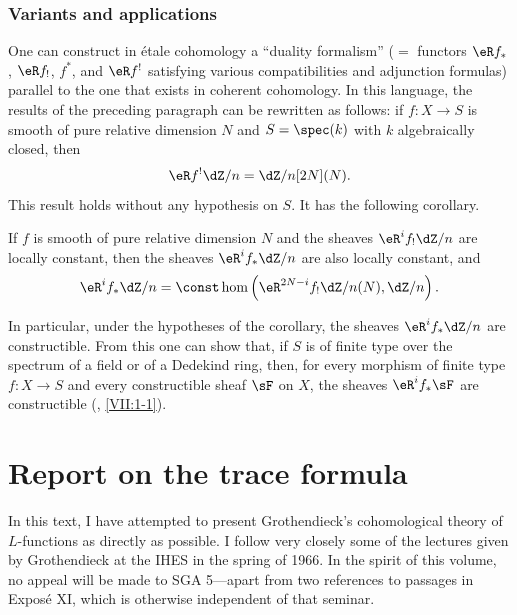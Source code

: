 \documentclass[oneside]{book}
\begin{document}
\subsection{Variants and applications}\label{I:6-4}

One can construct in étale cohomology a “duality formalism”
($=$ functors $\eR f_*$, $\eR f_!$, $f^*$, and $\eR f^!$ satisfying various
compatibilities and adjunction formulas) parallel to the one that exists
in coherent cohomology. In this language, the results of the preceding
paragraph can be rewritten as follows: if $f:X\to S$ is smooth of pure
relative dimension $N$ and $S=\spec(k)$ with $k$ algebraically closed,
then
\[
  \eR f^! \dZ/n = \dZ/n [2N](N) \text{.}
\]
This result holds without any hypothesis on $S$. It has the following
corollary.

\begin{corollary}\label{I:6-4-1}
If $f$ is smooth of pure relative dimension $N$ and the sheaves
$\eR^if_!\dZ/n$ are locally constant, then the sheaves
$\eR^if_*\dZ/n$ are also locally constant, and
\[
  \eR^i f_* \dZ/n = \const\hom\left(\eR^{2 N-i} f_! \dZ/n(N),\dZ/n\right)\text{.}
\]
\end{corollary}

In particular, under the hypotheses of the corollary, the sheaves
$\eR^if_*\dZ/n$ are constructible. From this one can show that, if $S$
is of finite type over the spectrum of a field or of a Dedekind ring,
then, for every morphism of finite type $f:X\to S$ and every constructible
sheaf $\sF$ on $X$, the sheaves $\eR^if_*\sF$ are constructible
(, \ref{VII:1-1}).



\chapter{Report on the trace formula}\label{II}

In this text, I have attempted to present Grothendieck's cohomological theory
of $L$-functions as directly as possible. I follow very closely some of the
lectures given by Grothendieck at the IHES in the spring of 1966. In the
spirit of this volume, no appeal will be made to SGA 5---apart from two
references to passages in Exposé XI, which is otherwise independent of that
seminar.
\end{document}

